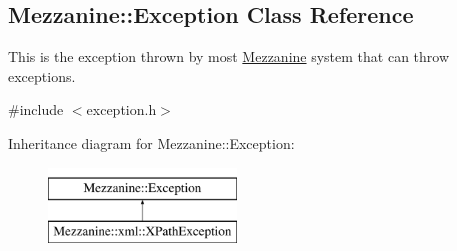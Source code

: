 \hypertarget{classMezzanine_1_1Exception}{
\subsection{Mezzanine::Exception Class Reference}
\label{classMezzanine_1_1Exception}
}


This is the exception thrown by most \hyperlink{namespaceMezzanine}{Mezzanine} system that can throw exceptions.  




{\ttfamily \#include $<$exception.h$>$}

Inheritance diagram for Mezzanine::Exception:\begin{figure}[H]
\begin{center}
\leavevmode
\includegraphics[height=2.000000cm]{classMezzanine_1_1Exception}
\end{center}
\end{figure}
